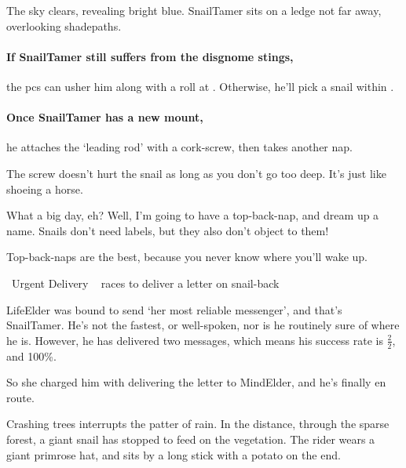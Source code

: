 \begin{boxtext}
  The sky clears, revealing bright blue.
  \Gls{SnailTamer} sits on a ledge not far away, overlooking \gls{shadepaths}.
\end{boxtext}

\paragraph{If \gls{SnailTamer} still suffers from the \gls{disgnome} stings,}
the \glspl{pc} can usher him along with a  roll at \tn[10].
Otherwise, he'll pick a snail within .

\paragraph{Once \gls{SnailTamer} has a new mount,}
he attaches the `leading rod' with a cork-screw, then takes another nap.

\begin{speechtext}
  The screw doesn't hurt the snail as long as you don't go too deep.
  It's just like shoeing a horse.

  What a big day, eh?
  Well, I'm going to have a top-back-nap, and dream up a name.
  Snails don't need labels, but they also don't object to them!

  Top-back-naps are the best, because you never know where you'll wake up.
\end{speechtext}

{\squash~Urgent Delivery}%
{~ races to deliver a letter on snail-back}%

\Gls{LifeElder} was bound to send `her most reliable messenger', and that's \gls{SnailTamer}.
He's not the fastest, or well-spoken, nor is he routinely sure of where he is.
However, he has delivered two messages, which means his success rate is $\frac{2}{2}$, and 100\%.

So she charged him with delivering the letter to \gls{MindElder}, and he's finally en route.

\begin{boxtext}
  Crashing trees interrupts the patter of rain.
  In the distance, through the sparse forest, a giant snail has stopped to feed on the vegetation.
  The rider wears a giant primrose hat, and sits by a long stick with a potato on the end.
\end{boxtext}

